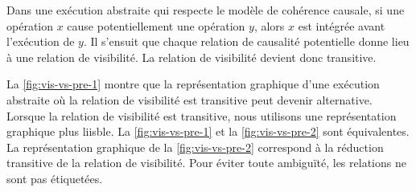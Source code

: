 Dans une exécution abstraite qui respecte le modèle de cohérence causale, si une opération $x$ cause potentiellement une opération $y$, alors $x$ est intégrée avant l'exécution de $y$.
Il s'ensuit que chaque relation de causalité potentielle donne lieu à une relation de visibilité.
La relation de visibilité devient donc transitive.

La \autoref{fig:vis-vs-pre-1} montre que la représentation graphique d'une exécution abstraite où la relation de visibilité est transitive peut devenir alternative.
Lorsque la relation de visibilité est transitive, nous utilisons une représentation graphique plus liisble.
La \autoref{fig:vis-vs-pre-1} et la \autoref{fig:vis-vs-pre-2} sont équivalentes.
La représentation graphique de la \autoref{fig:vis-vs-pre-2} correspond à la réduction transitive de la relation de visibilité.
Pour éviter toute ambiguïté, les relations ne sont pas étiquetées.





